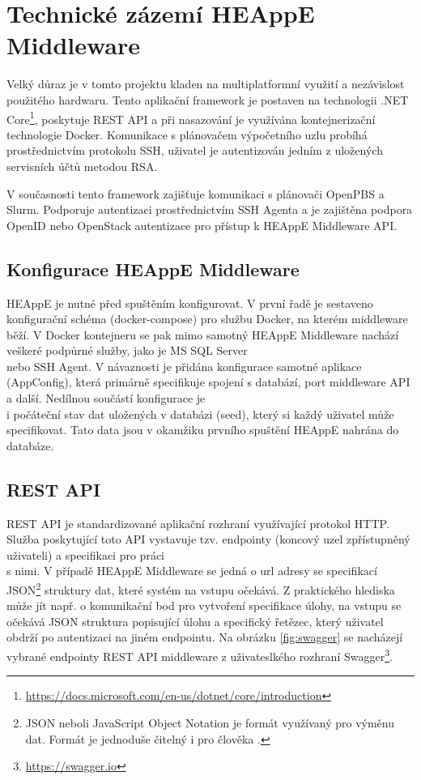 \section{Technické zázemí HEAppE Middleware}
Velký důraz je v tomto projektu kladen na multiplatformní využití a nezávislost použitého hardwaru. Tento aplikační framework je postaven na technologii .NET Core\footnote{\href{https://docs.microsoft.com/en-us/dotnet/core/introduction}{https://docs.microsoft.com/en-us/dotnet/core/introduction}}, poskytuje REST API a při nasazování je využívána kontejnerizační technologie Docker. Komunikace s plánovačem výpočetního uzlu probíhá prostřednictvím protokolu SSH, uživatel je autentizován jedním z uložených servisních účtů metodou RSA.

V současnosti tento framework zajišťuje komunikaci s plánovači OpenPBS a Slurm. Podporuje autentizaci prostřednictvím SSH Agenta a je zajištěna podpora OpenID nebo OpenStack autentizace pro přístup k HEAppE Middleware API.

\subsection{Konfigurace HEAppE Middleware}
HEAppE je nutné před spuštěním konfigurovat. V první řadě je sestaveno konfigurační schéma (docker-compose) pro službu Docker, na kterém middleware běží. V Docker kontejneru se pak mimo samotný HEAppE Middleware nachází veškeré podpůrné služby, jako je MS SQL Server \\nebo SSH Agent. V návaznosti je přidána konfigurace samotné aplikace (AppConfig), která primárně specifikuje spojení s databází, port middleware API a další. Nedílnou součástí konfigurace je \\i počáteční stav dat uložených v databázi (seed), který si každý uživatel může specifikovat. Tato data jsou v okamžiku prvního spuštění HEAppE nahrána do databáze.

\subsection{REST API}
REST API je standardizované aplikační rozhraní využívající protokol HTTP. Služba poskytující toto API vystavuje tzv. endpointy (koncový uzel zpřístupněný uživateli) a specifikaci pro práci \\s nimi. V případě HEAppE Middleware se jedná o url adresy se specifikací JSON\footnote{JSON neboli JavaScript Object Notation je formát využívaný pro výměnu dat. Formát je jednoduše čitelný i pro člověka \cite{lJoeVuQg92zsjaAe}.} struktury dat, které systém na vstupu očekává. Z praktického hlediska může jít např. o komunikační bod pro vytvoření specifikace úlohy, na vstupu se očekává JSON struktura popisující úlohu a specifický řetězec, který uživatel obdrží po autentizaci na jiném endpointu. Na obrázku \ref{fig:swagger} se nacházejí vybrané endpointy REST API middleware z uživateslkého rozhraní Swagger\footnote{\href{https://swagger.io}{https://swagger.io}}.


